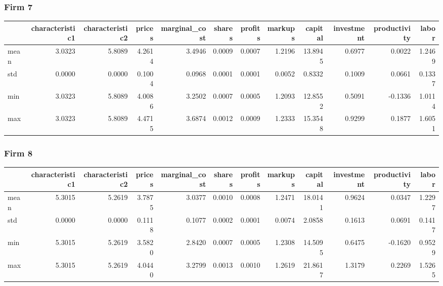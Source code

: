  \subsubsection*{Firm 7}
\begin{tabular}{lrrrrrrrrrrr}
\toprule
{} &  characteristic1 &  characteristic2 &  prices &  marginal\_cost &  shares &  profits &  markups &  capital &  investment &  productivity &  labor \\
\midrule
mean &           3.0323 &           5.8089 &  4.2614 &         3.4946 &  0.0009 &   0.0007 &   1.2196 &  13.8945 &      0.6977 &        0.0022 & 1.2469 \\
std  &           0.0000 &           0.0000 &  0.1004 &         0.0968 &  0.0001 &   0.0001 &   0.0052 &   0.8332 &      0.1009 &        0.0661 & 0.1337 \\
min  &           3.0323 &           5.8089 &  4.0086 &         3.2502 &  0.0007 &   0.0005 &   1.2093 &  12.8552 &      0.5091 &       -0.1336 & 1.0114 \\
max  &           3.0323 &           5.8089 &  4.4715 &         3.6874 &  0.0012 &   0.0009 &   1.2333 &  15.3548 &      0.9299 &        0.1877 & 1.6051 \\
\bottomrule
\end{tabular}


 \subsubsection*{Firm 8}
\begin{tabular}{lrrrrrrrrrrr}
\toprule
{} &  characteristic1 &  characteristic2 &  prices &  marginal\_cost &  shares &  profits &  markups &  capital &  investment &  productivity &  labor \\
\midrule
mean &           5.3015 &           5.2619 &  3.7875 &         3.0377 &  0.0010 &   0.0008 &   1.2471 &  18.0141 &      0.9624 &        0.0347 & 1.2297 \\
std  &           0.0000 &           0.0000 &  0.1118 &         0.1077 &  0.0002 &   0.0001 &   0.0074 &   2.0858 &      0.1613 &        0.0691 & 0.1417 \\
min  &           5.3015 &           5.2619 &  3.5820 &         2.8420 &  0.0007 &   0.0005 &   1.2308 &  14.5095 &      0.6475 &       -0.1620 & 0.9529 \\
max  &           5.3015 &           5.2619 &  4.0440 &         3.2799 &  0.0013 &   0.0010 &   1.2619 &  21.8617 &      1.3179 &        0.2269 & 1.5265 \\
\bottomrule
\end{tabular}


